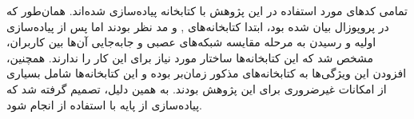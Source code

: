 تمامی کدهای مورد استفاده در این پژوهش با کتابخانه
پیاده‌سازی شده‌اند. همان‌طور که در پروپوزال بیان شده بود، ابتدا کتابخانه‌های
,
و
مد نظر بودند اما پس از پیاده‌سازی اولیه و رسیدن به مرحله مقایسه شبکه‌های عصبی و جابه‌جایی آن‌ها بین کاربران، مشخص شد که این کتابخانه‌ها ساختار مورد نیاز برای این کار را ندارند. همچنین، افزودن این ویژگی‌ها به کتابخانه‌های مذکور زمان‌بر بوده و این کتابخانه‌ها شامل بسیاری از امکانات غیرضروری برای این پژوهش بودند. به همین دلیل، تصمیم گرفته شد که پیاده‌سازی از پایه با استفاده از
انجام شود.



%
%
%
%
%
%
%
%
